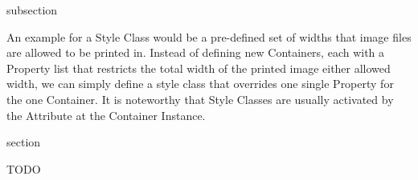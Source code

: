 \begin{Heading}{subsection}
\end{Heading}

An example for a Style Class would be a pre-defined set of widths that
image files are allowed to be printed in. Instead of defining new
 Containers, each with a Property list that
restricts the total width of the printed image either allowed width,
we can simply define a style class that overrides one single Property
for the one  Container. It is noteworthy that
Style Classes are usually activated by the  Attribute
at the Container Instance.









\begin{Heading}{section}
\end{Heading}

TODO
